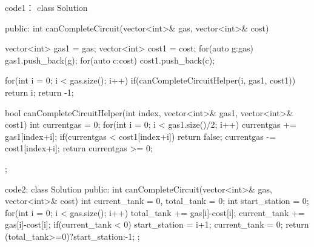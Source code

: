 code1：
class Solution {
public:
    int canCompleteCircuit(vector<int>& gas, vector<int>& cost) {
        vector<int> gas1 = gas;
        vector<int> cost1 = cost;
        for(auto g:gas)
            gas1.push_back(g);
        for(auto c:cost)
            cost1.push_back(c);
        
        for(int i = 0; i < gas.size(); i++)
        {
            if(canCompleteCircuitHelper(i, gas1, cost1)) return i;
        }
        return -1;
    }
    bool canCompleteCircuitHelper(int index, vector<int>& gas1, vector<int>& cost1)
    {
        int currentgas = 0;
        for(int i = 0; i < gas1.size()/2; i++)
        {
            currentgas += gas1[index+i];
            if(currentgas < cost1[index+i]) return false;
            currentgas -= cost1[index+i];
        }
        return currentgas >= 0;
    }
};


code2:
class Solution {
public:
    int canCompleteCircuit(vector<int>& gas, vector<int>& cost) {
        int current_tank = 0, total_tank = 0;
        int start_station = 0;
        for(int i = 0; i < gas.size(); i++)
        {
            total_tank += gas[i]-cost[i];
            current_tank += gas[i]-cost[i];
            if(current_tank < 0)
            {
                start_station = i+1;
                current_tank = 0;
            }
        }
        return (total_tank>=0)?start_station:-1;
    }
};